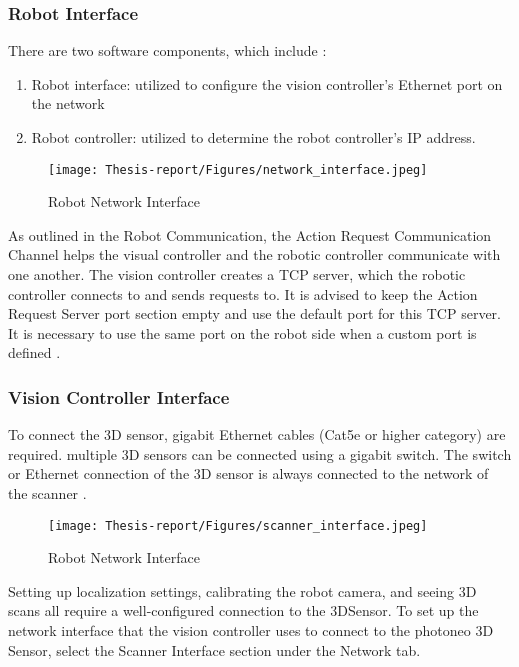 \documentclass[12pt]{article}
\begin{document}
\subsubsection{Robot Interface}
There are two software components, which include \cite{ref2}:
\begin{enumerate}
    \item   Robot interface: utilized to configure the vision controller's Ethernet port on the network
    \item   Robot controller: utilized to determine the robot controller's IP address.
\end{enumerate}
\begin{figure}[h]
    \centering
    \texttt{[image: Thesis-report/Figures/network\_interface.jpeg]}
    \caption{Robot Network Interface\cite{ref2}}
    \label{fig:network-interface}
\end{figure}
 As outlined in the Robot Communication, the Action Request Communication Channel helps the visual controller and the robotic controller communicate with one another.  The vision controller creates a TCP server, which the robotic controller connects to and sends requests to.
 It is advised to keep the Action Request Server port section empty and use the default port for this TCP server.  It is necessary to use the same port on the robot side when a custom port is defined \cite{ref2}.

\subsubsection{Vision Controller Interface}
To connect the 3D sensor, gigabit Ethernet cables (Cat5e or higher category) are required.  multiple 3D sensors can be connected using a gigabit switch.  The switch or Ethernet connection of the 3D sensor is always connected to the network of the scanner \cite{ref2}.
\begin{figure}[h]
    \centering
    \texttt{[image: Thesis-report/Figures/scanner\_interface.jpeg]}
    \caption{Robot Network Interface \cite{ref2}}
    \label{fig:scanner-interface}
\end{figure}

 Setting up localization settings, calibrating the robot camera, and seeing 3D scans all require a well-configured connection to the 3DSensor. To set up the network interface that the vision controller uses to connect to the photoneo 3D Sensor, select the Scanner Interface section under the Network tab\cite{ref2}.\\
\end{document}

